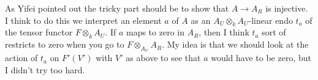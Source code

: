 \medskip\noindent
As Yifei pointed out the tricky part should be to show that $A \to A_R$
is injective. I think to do this we interpret an element $a$ of $A$
as an $A_U \otimes_k A_U$-linear endo $t_a$ of the tensor functor
$F \otimes_k A_U$. If $a$ maps to zero in $A_R$, then I think $t_a$
sort of restricts to zero when you go to $F \otimes_{A_U} A_R$.
My idea is that we should look at the action of $t_a$ on $F'(V')$
with $V'$ as above to see that $a$ would have to be zero,
but I didn't try too hard.











